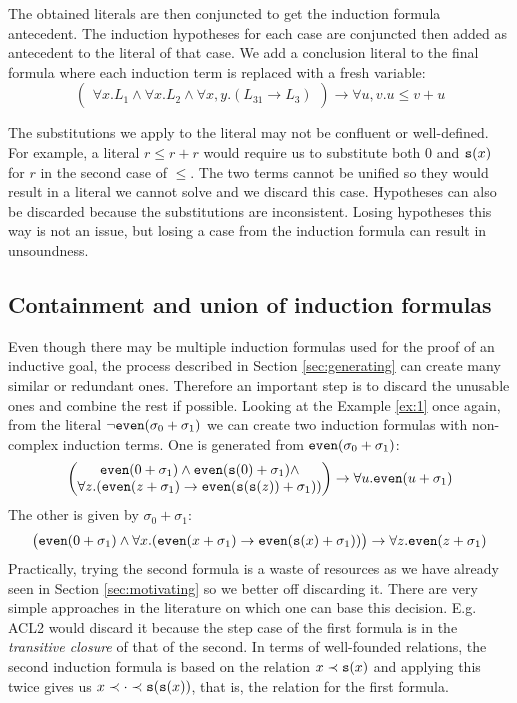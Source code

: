The obtained literals are then conjuncted to get the induction formula antecedent. The induction hypotheses for each case are conjuncted then added as antecedent to the literal of that case. We add a conclusion literal to the final formula where each induction term is replaced with a fresh variable:
$$\begin{pmatrix}\forall x.L_1\land\forall x.L_2\land\forall x,y.(L_{31}\rightarrow L_3)\end{pmatrix}\rightarrow \forall u,v.u\leq v+u$$

The substitutions we apply to the literal may not be confluent or well-defined. For example, a literal $r\leq r+r$ would require us to substitute both $0$ and $\mathtt{s}(x)$ for $r$ in the second case of $\leq$. The two terms cannot be unified so they would result in a literal we cannot solve and we discard this case. Hypotheses can also be discarded because the substitutions are inconsistent. Losing hypotheses this way is not an issue, but losing a case from the induction formula can result in unsoundness. 

\subsection{Containment and union of induction formulas}
Even though there may be multiple induction formulas used for the proof of an inductive goal, the process described in Section \ref{sec:generating} can create many similar or redundant ones. Therefore an important step is to discard the unusable ones and combine the rest if possible. Looking at the Example \ref{ex:1} once again, from the literal $\neg\mathtt{even}(\sigma_0+\sigma_1)$ we can create two induction formulas with non-complex induction terms. One is generated from $\mathtt{even}(\sigma_0+\sigma_1)$:
\begin{equation}\label{eq:even1}\begin{pmatrix}\mathtt{even}(0+\sigma_1)\land\mathtt{even}(\mathtt{s}(0)+\sigma_1)\land\\
\forall z.(\mathtt{even}(z+\sigma_1)\rightarrow\mathtt{even}(\mathtt{s}(\mathtt{s}(z))+\sigma_1))\end{pmatrix}\rightarrow \forall u.\mathtt{even}(u+\sigma_1)\end{equation}
The other is given by $\sigma_0+\sigma_1$:
\begin{equation}\label{eq:even2}\begin{pmatrix}\mathtt{even}(0+\sigma_1)\land\forall x.(\mathtt{even}(x+\sigma_1)\rightarrow\mathtt{even}(\mathtt{s}(x)+\sigma_1))\end{pmatrix}\rightarrow \forall z.\mathtt{even}(z+\sigma_1)\end{equation}
Practically, trying the second formula is a waste of resources as we have already seen in Section \ref{sec:motivating} so we better off discarding it. There are very simple approaches in the literature on which one can base this decision. E.g. ACL2 would discard it because the step case of the first formula is in the \textit{transitive closure} of that of the second. In terms of well-founded relations, the second induction formula is based on the relation $x\prec\mathtt{s}(x)$ and applying this twice gives us $x\prec\cdot\prec\mathtt{s}(\mathtt{s}(x))$, that is, the relation for the first formula.

